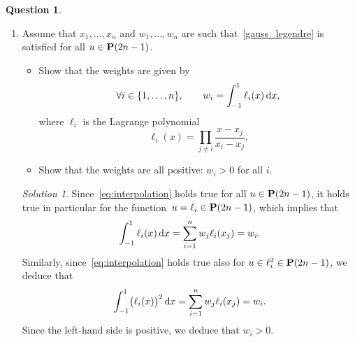 \documentclass[11pt]{article}
\theoremstyle{definition}
\newtheorem{question}{Question}
\theoremstyle{remark}
\newtheorem*{solution}{Solution}
\begin{document}
\begin{question}
\begin{enumerate}
        \item
            Assume that $x_1, \dotsc, x_n$ and $w_1, \dotsc, w_n$ are such that~\eqref{gauss_legendre} is satisfied for all $u \in \mathbf P(2n-1)$.
            \begin{itemize}

                \item
                    Show that the weights are given by
                    \[
                        \forall i \in \{1, \dotsc, n\}, \qquad
                        w_i = \int_{-1}^{1} \ell_i(x) \, \mathrm d x,
                    \]
                    where $\ell_i$ is the Lagrange polynomial
                    \[
                        \ell_i(x) = \prod_{j \neq i} \frac{x - x_j}{x_i - x_j}.
                    \]

                \item
                    Show that the weights are all positive: $w_i > 0$ for all $i$.
            \end{itemize}
            \begin{solution}
                Since~\eqref{eq:interpolation} holds true for all $u \in \mathbf P(2n-1)$,
                it holds true in particular for the function~$u = \ell_i \in \mathbf P(2n-1)$,
                which implies that
                \[
                    \int_{-1}^{1} \ell_i(x) \, \mathrm d x = \sum_{i=1}^{n} w_j \ell_i(x_j) = w_i.
                \]
                Similarly, since~\eqref{eq:interpolation} holds true also for $u \in \ell_i^2 \in \mathbf P(2n-1)$,
                we deduce that
                \[
                    \int_{-1}^{1} \bigl(\ell_i(x)\bigr)^2 \, \mathrm d x 
                    = \sum_{i=1}^{n} w_j \ell_i(x_j) = w_i.
                \]
                Since the left-hand side is positive, 
                we deduce that $w_i > 0$.
            \end{solution}


\end{enumerate}
\end{question}
\end{document}
